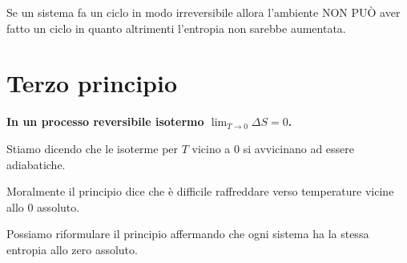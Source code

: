 \begin{remark}
Se un sistema fa un ciclo in modo irreversibile allora l'ambiente NON PU\`O aver fatto un ciclo in quanto altrimenti l'entropia non sarebbe aumentata.
\end{remark}

\section{Terzo principio}
\begin{fact}
\textbf{In un processo reversibile isotermo $\lim_{T\to 0}\Delta S=0$.}
\end{fact}
\begin{remark}
Stiamo dicendo che le isoterme per $T$ vicino a $0$ si avvicinano ad essere adiabatiche.
\end{remark}

\begin{remark}
Moralmente il principio dice che \`e difficile raffreddare verso temperature vicine allo 0 assoluto.
\end{remark}

\begin{remark}
Possiamo riformulare il principio affermando che ogni sistema ha la stessa entropia allo zero assoluto.
\end{remark}